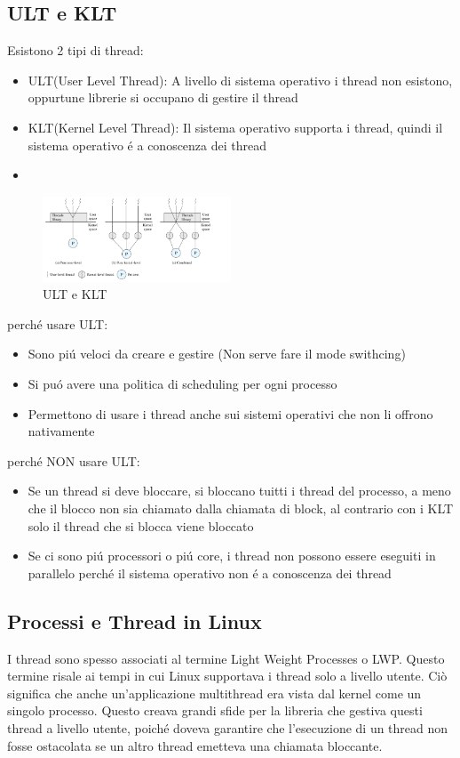 \documentclass[11pt]{article}
\begin{document}
\subsection{ULT e KLT}
Esistono 2 tipi di thread:
\begin{itemize}
    \item ULT(User Level Thread): A livello di sistema operativo i thread non esistono, oppurtune librerie si occupano di gestire il thread
    \item KLT(Kernel Level Thread): Il sistema operativo supporta i thread, quindi il sistema operativo é a conoscenza dei thread
    \item
\end{itemize}
\begin{figure}[H]
    \centering
    \includegraphics[width=0.5\textwidth]{immagini/ULTeKLT}
    \caption{ULT e KLT}
\end{figure}
perché usare ULT:
\begin{itemize}
    \item Sono piú veloci da creare e gestire (Non serve fare il mode swithcing)
    \item Si puó avere una politica di scheduling per ogni processo
    \item Permettono di usare i thread anche sui sistemi operativi che non li offrono nativamente
\end{itemize}
perché NON usare ULT:
\begin{itemize}
    \item Se un thread si deve bloccare, si bloccano tuitti i thread del processo, a meno che il blocco non sia chiamato
    dalla chiamata di block, al contrario con i KLT solo il thread che si blocca viene bloccato
    \item Se ci sono piú processori o piú core, i thread non possono essere eseguiti in parallelo perché il sistema operativo
    non é a conoscenza dei thread
\end{itemize}
\subsection{Processi e Thread in Linux}

I thread sono spesso associati al termine Light Weight Processes o LWP. Questo termine risale ai tempi in cui Linux supportava i thread solo a livello utente. Ciò significa che anche un'applicazione multithread era vista dal kernel come un singolo processo. Questo creava grandi sfide per la libreria che gestiva questi thread a livello utente, poiché doveva garantire che l'esecuzione di un thread non fosse ostacolata se un altro thread emetteva una chiamata bloccante.
\end{document}
